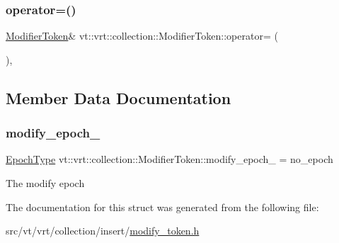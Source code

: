 \mbox{\label{structvt_1_1vrt_1_1collection_1_1_modifier_token_a781c57243819fb3bd6f37b60f97faf0a}} 
\subsubsection{\texorpdfstring{operator=()}{operator=()}\hspace{0.1cm}{\footnotesize\ttfamily [2/2]}}
{\footnotesize\ttfamily \hyperlink{structvt_1_1vrt_1_1collection_1_1_modifier_token}{Modifier\+Token}\& vt\+::vrt\+::collection\+::\+Modifier\+Token\+::operator= (\begin{DoxyParamCaption}\item[{\hyperlink{structvt_1_1vrt_1_1collection_1_1_modifier_token}{Modifier\+Token} \&\&}]{ }\end{DoxyParamCaption})\hspace{0.3cm}{\ttfamily [default]}, {\ttfamily [noexcept]}}



\subsection{Member Data Documentation}
\mbox{\label{structvt_1_1vrt_1_1collection_1_1_modifier_token_a3c0115cdf4a5097aa9ff940b0e8c9172}} 
\subsubsection{\texorpdfstring{modify\+\_\+epoch\+\_\+}{modify\_epoch\_}}
{\footnotesize\ttfamily \hyperlink{namespacevt_a81d11b28122d43bf9834577e4a06440f}{Epoch\+Type} vt\+::vrt\+::collection\+::\+Modifier\+Token\+::modify\+\_\+epoch\+\_\+ = no\+\_\+epoch\hspace{0.3cm}{\ttfamily [private]}}

The modify epoch 

The documentation for this struct was generated from the following file\+:\begin{DoxyCompactItemize}
\item 
src/vt/vrt/collection/insert/\hyperlink{modify__token_8h}{modify\+\_\+token.\+h}\end{DoxyCompactItemize}
